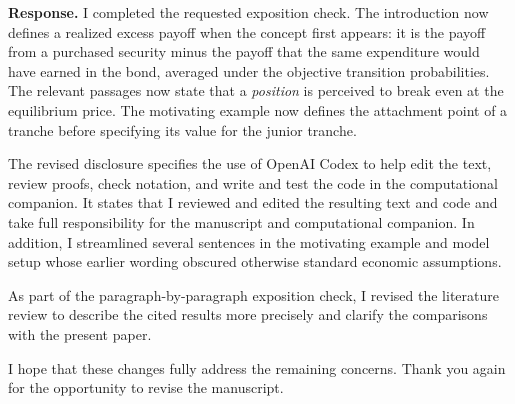 \documentclass[11pt]{article}
\newcommand{\response}[1]{\par\noindent\textbf{Response.} #1\par}
\begin{document}
\response{I completed the requested exposition check. The introduction now defines a realized excess payoff when the concept first appears: it is the payoff from a purchased security minus the payoff that the same expenditure would have earned in the bond, averaged under the objective transition probabilities. The relevant passages now state that a \emph{position} is perceived to break even at the equilibrium price. The motivating example now defines the attachment point of a tranche before specifying its value for the junior tranche.

The revised disclosure specifies the use of OpenAI Codex to help edit the text, review proofs, check notation, and write and test the code in the computational companion. It states that I reviewed and edited the resulting text and code and take full responsibility for the manuscript and computational companion. In addition, I streamlined several sentences in the motivating example and model setup whose earlier wording obscured otherwise standard economic assumptions.

As part of the paragraph-by-paragraph exposition check, I revised the literature review to describe the cited results more precisely and clarify the comparisons with the present paper.}

\bigskip

I hope that these changes fully address the remaining concerns. Thank you again for the opportunity to revise the manuscript.
\end{document}
